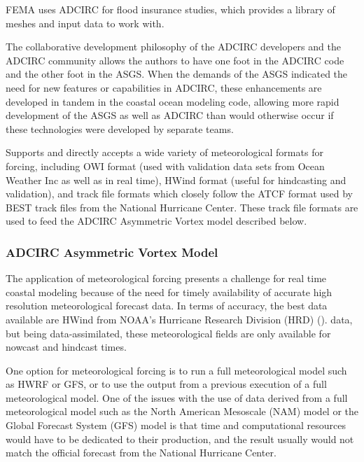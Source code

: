 \documentclass[12pt]{article}
\begin{document}
FEMA uses ADCIRC for flood insurance studies, which provides a library
of meshes and input data to work with.

The collaborative development philosophy of the ADCIRC developers
and the ADCIRC community allows the authors to have one foot in the
ADCIRC code and the other foot in the ASGS. When the demands of the
ASGS indicated the need for new features or capabilities in ADCIRC, 
these enhancements are developed in tandem in the coastal ocean modeling
code, allowing more rapid development of the ASGS as well as ADCIRC
than would otherwise occur if these technologies were developed by
separate teams. 

Supports and directly accepts a wide variety of meteorological 
formats for forcing, including OWI format (used with validation data 
sets from Ocean Weather Inc as well as in real time), HWind format 
(useful for hindcasting and validation), and track file formats which
closely follow the ATCF format used by BEST track files from the 
National Hurricane Center. These track file formats are used to feed
the ADCIRC Asymmetric Vortex model described below. 

\subsubsection{ADCIRC Asymmetric Vortex Model}

The application of meteorological forcing presents a challenge for 
real time coastal modeling because of the need for timely 
availability of accurate high resolution meteorological forecast 
data. In terms of accuracy, the best data available are HWind from 
NOAA's Hurricane Research Division (HRD) (\cite{PowellMD1998}). 
data, but being data-assimilated, these meteorological fields are 
only available for nowcast and hindcast times.

One option for meteorological forcing is to run a full 
meteorological model such as HWRF or GFS, or to use the output from 
a previous execution of a full meteorological model. One of the 
issues with the use of data derived from a full meteorological model 
such as the North American Mesoscale (NAM) model or the Global 
Forecast System (GFS) model is that time and computational resources 
would have to be dedicated to their production, and the result 
usually would not match the official forecast from the National 
Hurricane Center. 
\end{document}
